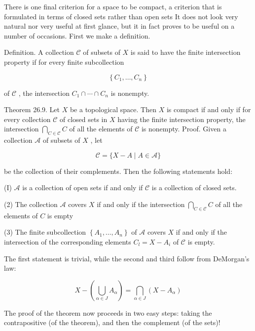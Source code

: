 There is one final criterion for a space to be compact, a criterion that is formulated in terms of closed sets rather than open sets It does not look very natural nor very useful at first glance, but it in fact proves to be useful on a number of occasions. First we make a definition.

Definition. A collection \(\mathcal{C}\) of subsets of \(X\) is said to have the finite intersection property if for every finite subcollection

\[
\left\{  {{C}_{1},\ldots ,{C}_{n}}\right\}
\]

of \(\mathcal{C}\) , the intersection \({C}_{1} \cap  \cdots  \cap  {C}_{n}\) is nonempty.

Theorem 26.9. Let \(X\) be a topological space. Then \(X\) is compact if and only if for every collection \(\mathcal{C}\) of closed sets in \(X\) having the finite intersection property, the intersection \(\mathop{\bigcap }\limits_{{C \in  \mathcal{C}}}C\) of all the elements of \(\mathcal{C}\) is nonempty. Proof. Given a collection \(\mathcal{A}\) of subsets of \(X\) , let

\[
\mathcal{C} = \{ X - A \mid  A \in  \mathcal{A}\}
\]

be the collection of their complements. Then the following statements hold:

(I) \(\mathcal{A}\) is a collection of open sets if and only if \(\mathcal{C}\) is a collection of closed sets.

(2) The collection \(\mathcal{A}\) covers \(X\) if and only if the intersection \(\mathop{\bigcap }\limits_{{C \in  \mathcal{C}}}C\) of all the elements of \(C\) is empty

(3) The finite subcollection \(\left\{  {{A}_{1},\ldots ,{A}_{n}}\right\}\) of \(\mathcal{A}\) covers \(X\) if and only if the intersection of the corresponding elements \({C}_{l} = X - {A}_{i}\) of \(\mathcal{C}\) is empty.

The first statement is trivial, while the second and third follow from DeMorgan's law:

\[
X - \left( {\mathop{\bigcup }\limits_{{\alpha  \in  J}}{A}_{\alpha }}\right)  = \mathop{\bigcap }\limits_{{\alpha  \in  J}}\left( {X - {A}_{\alpha }}\right)
\]

The proof of the theorem now proceeds in two easy steps: taking the contrapositive (of the theorem), and then the complement (of the sets)!


